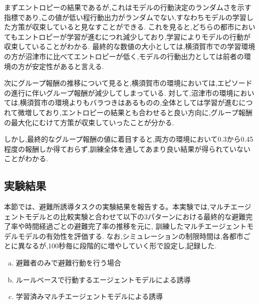 まずエントロピーの結果であるが,これはモデルの行動決定のランダムさを示す指標であり,この値が低い程行動出力がランダムでない,すなわちモデルの学習した方策が収束していると見なすことができる.
これを見ると,どちらの都市においてもエントロピーが学習が進むにつれ減少しており,学習によりモデルの行動が収束していることがわかる.
最終的な数値の大小としては,横須賀市での学習環境の方が沼津市に比べてエントロピーが低く,モデルの行動出力としては前者の環境の方が安定性があると言える.\par 
次にグループ報酬の推移について見ると,横須賀市の環境においては,エピソードの進行に伴いグループ報酬が減少してしまっている.
対して,沼津市の環境においては,横須賀市の環境よりもバラつきはあるものの,全体としては学習が進むにつれて微増しており,エントロピーの結果とも合わせると良い方向に,グループ報酬の最大化にむけて方策が収束していったことが分かる.\par
しかし,最終的なグループ報酬の値に着目すると,両方の環境において0.3から0.45程度の報酬しか得ておらず,訓練全体を通してあまり良い結果が得られていないことがわかる.
\subsection{実験結果}
本節では、避難所誘導タスクの実験結果を報告する。本実験では,マルチエージェントモデルとの比較実験と合わせて以下の3パターンにおける最終的な避難完了率や時間経過ごとの避難完了率の推移を元に,
訓練したマルチエージェントモデルモデルの有効性を評価する.
なお,シミュレーションの制限時間は,各都市ごとに異なるが,100秒毎に段階的に増やしていく形で設定し,記録した.
\begin{enumerate}[(a)]
  \item 避難者のみで避難行動を行う場合
  \item ルールベースで行動するエージェントモデルによる誘導
  \item 学習済みマルチエージェントモデルによる誘導
\end{enumerate}
